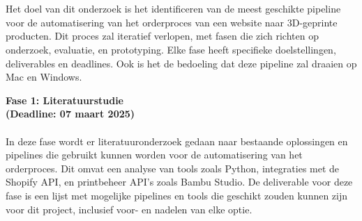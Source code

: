 

\chapter{}%
\label{ch:methodologie}


Het doel van dit onderzoek is het identificeren van de meest geschikte pipeline voor de automatisering van het orderproces van een website naar 3D-geprinte producten. Dit proces zal iteratief verlopen, met fasen die zich richten op onderzoek, evaluatie, en prototyping. Elke fase heeft specifieke doelstellingen, deliverables en deadlines. Ook is het de bedoeling dat deze pipeline zal draaien op Mac en Windows.
\vspace{2em}

\textbf{Fase 1: Literatuurstudie}\\
\textbf{(Deadline: 07 maart 2025)}\\\\
In deze fase wordt er literatuuronderzoek gedaan naar bestaande oplossingen en pipelines die gebruikt kunnen worden voor de automatisering van het orderproces. Dit omvat een analyse van tools zoals Python, integraties met de Shopify API, en printbeheer API's zoals Bambu Studio. De deliverable voor deze fase is een lijst met mogelijke pipelines en tools die geschikt zouden kunnen zijn voor dit project, inclusief voor- en nadelen van elke optie.
\vspace{2em}


